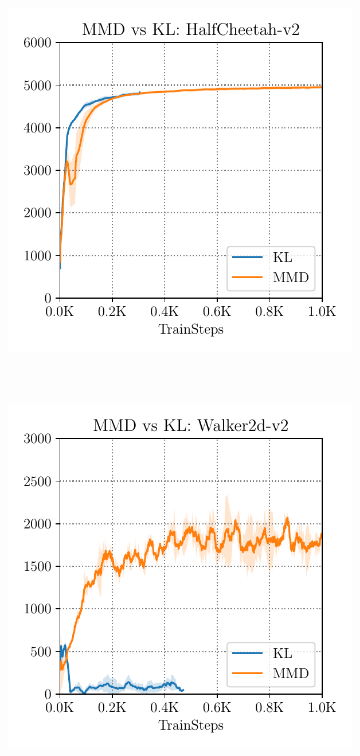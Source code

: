 \begin{figure}[t]
    \centering
    \begin{subfigure}[t]{0.31\textwidth}
        \centering
        \includegraphics[width=0.99\linewidth]{chapters/bear/images/kl_vs_mmd_cheetah.pdf}
    \end{subfigure}%
    ~
    \begin{subfigure}[t]{0.31\textwidth}
        \centering
        \includegraphics[width=0.99\linewidth]{chapters/bear/images/kl_vs_mmd_walker_old.pdf}

\end{subfigure}
\end{figure}
